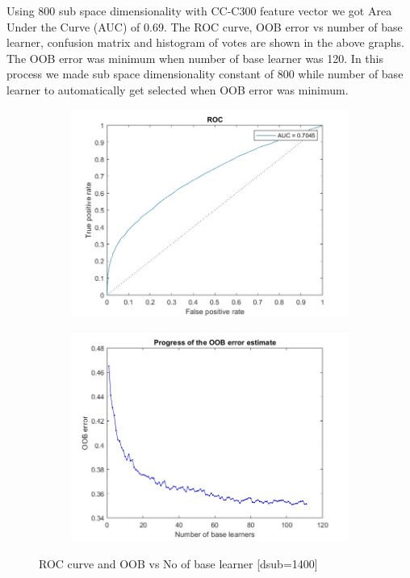 \begin{flushleft}
Using 800 sub space dimensionality with CC-C300 feature vector we got Area Under the Curve (AUC) of 0.69. The ROC curve, OOB error vs number of base learner, confusion matrix and histogram of votes are shown in the above graphs. The OOB error was minimum when number of base learner was 120. In this process we made sub space dimensionality constant of 800 while number of base learner to automatically get selected when OOB error was minimum. 
\end{flushleft}

\begin{figure}[H]
    \begin{subfigure}[b]{0.5\textwidth}
        \includegraphics[width=\textwidth]{img/1400/gray1400roc.jpg}
    \end{subfigure}
    \hfill
    \begin{subfigure}[b]{0.5\textwidth}
        \includegraphics[width=\textwidth]{img/1400/gray1400saturate.jpg}
    \end{subfigure}
    \caption{ROC curve and OOB vs No of base learner [dsub=1400]}
\end{figure}
